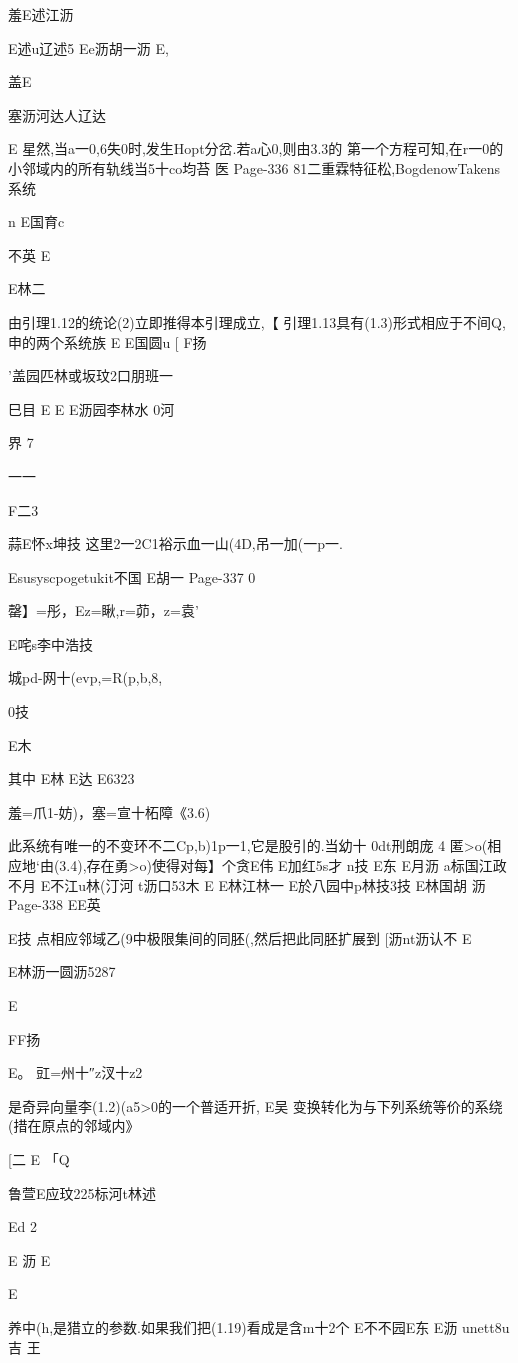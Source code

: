 {{{{{{{{{{{{{{{{{{{{羞E述江沥

E述u辽述5
Ee沥胡一沥
E,

盖E

塞沥河达人辽达

E
星然,当a一0,6失0时,发生Hopt分岔.若a心0,则由3.3的
第一个方程可知,在r一0的小邻域内的所有轨线当5十co均苔
医
Page-336
81二重霖特征松,BogdenowTakens系统

n
E国育c

不英
E

E林二

由引理1.12的统论(2)立即推得本引理成立,【
引理1.13具有(1.3)形式相应于不间Q,申的两个系统族
E
E国圆u
[
F扬

'盖园匹林或坂玟2口朋班一

巳目
E
E
E沥园李林水
0河

界
7

一一

F二3

蒜E怀x坤技
这里2一2C1裕示血一山(4D,吊一加(一p一.

Esusyscpogetukit不国
E胡一
Page-337
0

罄】=彤，Ez=瞅,r=茆，z=袁'

E咤s李中浩技

城pd-网十(evp,=R(p,b,8,

0技

E木

其中
E林
E达
E6323

羞=爪1-妨)，塞=宣十柘障《3.6)

此系统有唯一的不变环不二{Cp,b)1p一1},它是股引的.当幼十
0dt刑朗庞
4
匿>o(相应地`由(3.4),存在勇>o)使得对每】个贪E伟
E加红5s才
n技
E东
E月沥
a标国江政不月
E不江u林(汀河
t沥口53木
E
E林江林一
E於八园中p林技3技
E林国胡
沥
Page-338
EE英

E技
点相应邻域乙(9中极限集间的同胚(,然后把此同胚扩展到
[沥nt沥认不
E

E林沥一圆沥5287

E

FF扬

E。
豇=州十″z汊十z2

是奇异向量李(1.2)(a5>0的一个普适开折,
E吴
变换转化为与下列系统等价的系绕(措在原点的邻域内》

[二
E
「Q

鲁萱E应玟225标河t林述

Ed
2

E
沥
E

E

养中(h,是猎立的参数.如果我们把(1.19)看成是含m十2个
E不不园E东
E沥
unett8u吉
王

}}}}}}}}}}}}}}}}}}}}
